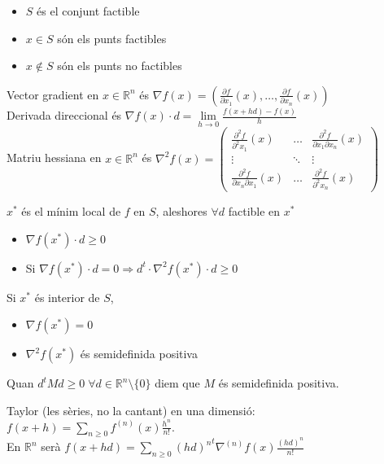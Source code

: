\documentclass[../main.tex]{subfiles}
\begin{document}
\begin{definicio}
\begin{itemize}
\item $S$ és el conjunt factible
\item $x \in S$ són els punts factibles
\item $x \not\in S$ són els punts no factibles
\end{itemize}
\end{definicio}
\begin{notacio}
Vector gradient en $x \in \mathbb{R}^n$ és $\nabla f(x) = \left(\frac{\partial f}{\partial x_1}(x), \dots, \frac{\partial f}{\partial x_n}(x)\right)$\\
Derivada direccional és $\nabla f(x) \cdot d = \lim\limits_{h\to0}\frac{f(x+hd)-f(x)}{h}$\\
Matriu hessiana en $x \in \mathbb{R}^n$ és $\nabla^2 f(x) = \begin{pmatrix}\frac{\partial^2 f}{\partial^2 x_1}(x) & \dots & \frac{\partial^2 f}{\partial x_1 \partial x_n}(x)\\\vdots & \ddots & \vdots\\ \frac{\partial^2 f}{\partial x_n \partial x_1}(x) & \dots & \frac{\partial^2 f}{\partial^2 x_n}(x)\end{pmatrix}$
\end{notacio}
\begin{teorema}
$x^*$ és el mínim local de $f$ en $S$, aleshores $\forall d$ factible en $x^*$
\begin{itemize}
\item $\nabla f(x^*) \cdot d \geq 0$
\item Si $\nabla f(x^*) \cdot d = 0 \Rightarrow d^t\cdot\nabla^2f(x^*)\cdot d \geq 0$
\end{itemize}
\end{teorema}
Si $x^*$ és interior de $S$,
\begin{itemize}
\item $\nabla f(x^*) = 0$
\item $\nabla^2 f(x^*)$ és semidefinida positiva
\end{itemize}
\begin{definicio}
Quan $d^tMd \geq 0\;\forall d \in \mathbb{R}^n\setminus\{0\}$ diem que $M$ és semidefinida positiva.
\end{definicio}
\begin{obs}
Taylor (les sèries, no la cantant) en una dimensió: $f(x + h) = \sum\limits_{n\geq 0} f^{(n)}(x)\frac{h^n}{n!}$.\\
En $\mathbb{R}^n$ serà $f(x+hd) = \sum\limits_{n\geq 0} {(hd)^n}^t\nabla^{(n)}f(x)\frac{(hd)^n}{n!}$
\end{obs}
\end{document}
